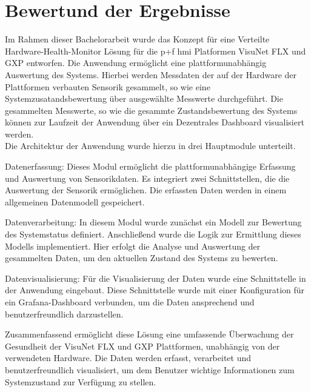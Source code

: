 \chapter{Bewertund der Ergebnisse}
Im Rahmen dieser Bachelorarbeit wurde das Konzept für eine Verteilte Hardware-Health-Monitor Lösung für die \acl{p+f} \ac{hmi} Platformen VisuNet FLX und GXP entworfen. Die Anwendung ermöglicht eine plattformunabhängig Auswertung des Systems. Hierbei werden Messdaten der auf der Hardware der Plattformen verbauten Sensorik gesammelt, so wie eine Systemzusatandsbewertung über ausgewählte Messwerte durchgeführt. Die gesammelten Messwerte, so wie die gesammte Zustandsbewertung des Systems können zur Laufzeit der Anwendung über ein Dezentrales Dashboard visualisiert werden.\\
Die Architektur der Anwendung wurde hierzu in drei Hauptmodule unterteilt.

Datenerfassung: Dieses Modul ermöglicht die plattformunabhängige Erfassung und Auswertung von Sensorikdaten. Es integriert zwei Schnittstellen, die die Auswertung der Sensorik ermöglichen. Die erfassten Daten werden in einem allgemeinen Datenmodell gespeichert.

Datenverarbeitung: In diesem Modul wurde zunächst ein Modell zur Bewertung des Systemstatus definiert. Anschließend wurde die Logik zur Ermittlung dieses Modells implementiert. Hier erfolgt die Analyse und Auswertung der gesammelten Daten, um den aktuellen Zustand des Systems zu bewerten.

Datenvisualisierung: Für die Visualisierung der Daten wurde eine Schnittstelle in der Anwendung eingebaut. Diese Schnittstelle wurde mit einer Konfiguration für ein Grafana-Dashboard verbunden, um die Daten ansprechend und benutzerfreundlich darzustellen.

Zusammenfassend ermöglicht diese Lösung eine umfassende Überwachung der Gesundheit der VisuNet FLX und GXP Plattformen, unabhängig von der verwendeten Hardware. Die Daten werden erfasst, verarbeitet und benutzerfreundlich visualisiert, um dem Benutzer wichtige Informationen zum Systemzustand zur Verfügung zu stellen.

